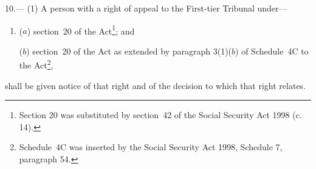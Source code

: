 \documentclass[a4paper,12pt]{article}
\begin{document}
10.—%
%
%
%
%
%
%
(1) A person with a right of appeal to 
the First-tier Tribunal  %
under---
\begin{enumerate}\item[]
($a$) section~20 of the Act\footnote{\frenchspacing Section 20 was substituted by section~42 of the Social Security Act 1998 (c. 14).}; and

($b$) section~20 of the Act as extended by paragraph 3(1)($b$) of Schedule~4C to the Act\footnote{\frenchspacing Schedule~4C was inserted by the Social Security Act 1998, Schedule 7, paragraph 54.},
\end{enumerate}
shall be given notice of that right and of the decision to which that right relates.
\end{document}
